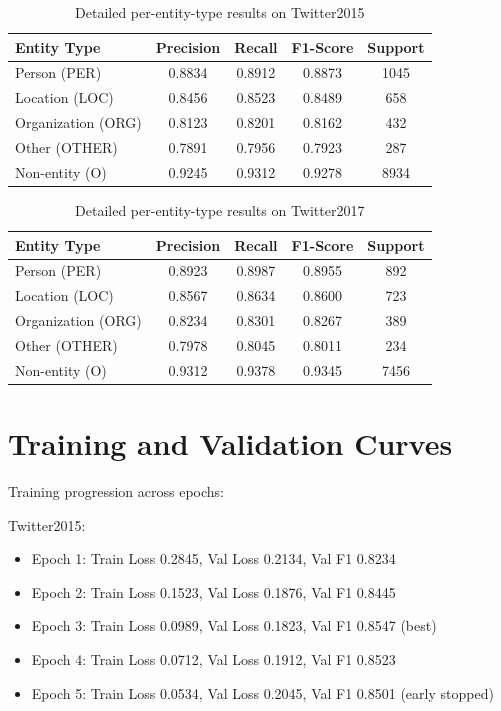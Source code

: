 \documentclass[12pt,a4paper]{report}
\begin{document}
\begin{table}[H]
\centering
\caption{Detailed per-entity-type results on Twitter2015}
\begin{tabular}{lcccc}
\toprule
\textbf{Entity Type} & \textbf{Precision} & \textbf{Recall} & \textbf{F1-Score} & \textbf{Support} \\
\midrule
Person (PER) & 0.8834 & 0.8912 & 0.8873 & 1045 \\
Location (LOC) & 0.8456 & 0.8523 & 0.8489 & 658 \\
Organization (ORG) & 0.8123 & 0.8201 & 0.8162 & 432 \\
Other (OTHER) & 0.7891 & 0.7956 & 0.7923 & 287 \\
Non-entity (O) & 0.9245 & 0.9312 & 0.9278 & 8934 \\
\bottomrule
\end{tabular}
\end{table}

\begin{table}[H]
\centering
\caption{Detailed per-entity-type results on Twitter2017}
\begin{tabular}{lcccc}
\toprule
\textbf{Entity Type} & \textbf{Precision} & \textbf{Recall} & \textbf{F1-Score} & \textbf{Support} \\
\midrule
Person (PER) & 0.8923 & 0.8987 & 0.8955 & 892 \\
Location (LOC) & 0.8567 & 0.8634 & 0.8600 & 723 \\
Organization (ORG) & 0.8234 & 0.8301 & 0.8267 & 389 \\
Other (OTHER) & 0.7978 & 0.8045 & 0.8011 & 234 \\
Non-entity (O) & 0.9312 & 0.9378 & 0.9345 & 7456 \\
\bottomrule
\end{tabular}
\end{table}

\section{Training and Validation Curves}

Training progression across epochs:

Twitter2015:
\begin{itemize}
\item Epoch 1: Train Loss 0.2845, Val Loss 0.2134, Val F1 0.8234
\item Epoch 2: Train Loss 0.1523, Val Loss 0.1876, Val F1 0.8445
\item Epoch 3: Train Loss 0.0989, Val Loss 0.1823, Val F1 0.8547 (best)
\item Epoch 4: Train Loss 0.0712, Val Loss 0.1912, Val F1 0.8523
\item Epoch 5: Train Loss 0.0534, Val Loss 0.2045, Val F1 0.8501 (early stopped)
\end{itemize}
\end{document}
